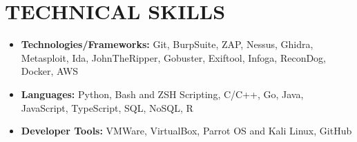 \documentclass[letterpaper,11pt]{article}
\makeatletter
\newcommand{\uniformunderline}[1]{%
  \uline{\phantom{#1}}%
  \llap{\contour{white}{#1}}%
}
\newcommand{\resumeItem}[1]{
  \item\small{
    {#1 \vspace{-2pt}}
  }
}
\newcommand{\resumeSubheading}[4]{
  \vspace{-2pt}\item
    \begin{tabular*}{1.0\textwidth}[t]{l@{\extracolsep{\fill}}r}
      \textbf{\large#1} & \textbf{\small #2} \\
      \textit{\large#3} & \textit{\small #4} \\
      
    \end{tabular*}\vspace{-7pt}
}
\newcommand{\resumeSubHeadingListStart}{\begin{itemize}[leftmargin=0.0in, label={}]}
\newcommand{\resumeSubHeadingListEnd}{\end{itemize}}
\newcommand{\resumeItemListStart}{\begin{itemize}}
\newcommand{\resumeItemListEnd}{\end{itemize}\vspace{-5pt}}
\makeatother
\begin{document}
\section{TECHNICAL SKILLS}
    \vspace{2.5pt}
    \begin{itemize}[leftmargin=0in, label={}]
        \small{\item{
        \resumeItemListStart
        
            \resumeItem{\textbf{\normalsize{Technologies/Frameworks:}}{ \normalsize{Git, BurpSuite, ZAP, Nessus, Ghidra, Metasploit, Ida, JohnTheRipper, Gobuster, Exiftool, Infoga, ReconDog, Docker, AWS}}} \vspace{2.5pt} \\
            
            \resumeItem{\textbf{\normalsize{Languages:}}{ \normalsize{Python, Bash and ZSH Scripting, C/C++, Go, Java, JavaScript, TypeScript, SQL, NoSQL, R}}} \vspace{2.5pt} \\
            
            \resumeItem{\textbf{\normalsize{Developer Tools:}}{ \normalsize{VMWare, VirtualBox, Parrot OS and Kali Linux, GitHub}}} \vspace{2.5pt} \\
            
        \resumeItemListEnd
    }}
    \end{itemize}
    \vspace{-7pt}



% 
%   



\end{document}
